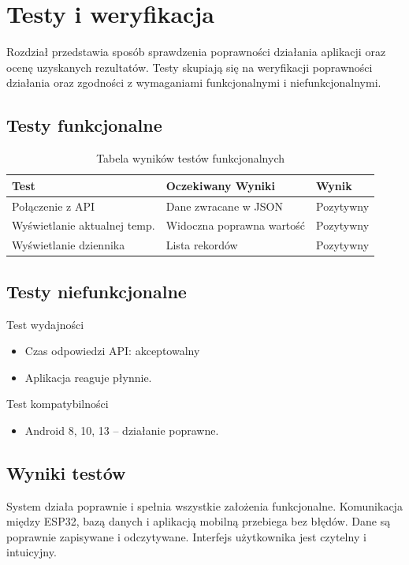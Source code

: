 \chapter{Testy i weryfikacja}
Rozdział przedstawia sposób sprawdzenia poprawności działania aplikacji oraz ocenę uzyskanych rezultatów. Testy skupiają się na weryfikacji poprawności działania oraz zgodności z wymaganiami funkcjonalnymi i niefunkcjonalnymi.

\section{Testy funkcjonalne}
\begin{table}[ht!]
\centering
\caption{Tabela wyników testów funkcjonalnych}
\label{tab:wyniki}
\begin{tabular}{lll}
\toprule
Test                            & Oczekiwany Wyniki             & Wynik \\  
\midrule
Połączenie z API                & Dane zwracane w JSON          & Pozytywny \\
Wyświetlanie aktualnej temp.    & Widoczna poprawna wartość     & Pozytywny \\ 
Wyświetlanie dziennika          & Lista rekordów                & Pozytywny \\
\bottomrule 
\end{tabular}
\end{table}

\section{Testy niefunkcjonalne}
Test wydajności
\begin{itemize}
	\item Czas odpowiedzi API: akceptowalny
	\item Aplikacja reaguje płynnie. \\
\end{itemize}

Test kompatybilności
\begin{itemize}
	\item Android 8, 10, 13 – działanie poprawne.
\end{itemize}

\section{Wyniki testów}
System działa poprawnie i spełnia wszystkie założenia funkcjonalne. Komunikacja między ESP32, bazą danych i aplikacją mobilną przebiega bez błędów. Dane są poprawnie zapisywane i odczytywane. Interfejs użytkownika jest czytelny i intuicyjny.
